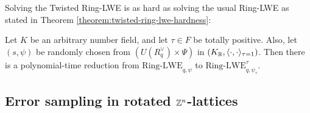 \documentclass[a4paper,12pt]{article}
\begin{document}
Solving the Twisted Ring-LWE is as hard as solving the usual Ring-LWE as stated in Theorem \ref{theorem:twisted-ring-lwe-hardness}:

\begin{theorem}
  \label{theorem:twisted-ring-lwe-hardness}
  Let $K$ be an arbitrary number field, and let $\tau \in F$ be totally positive.
  Also, let $(s,\psi)$ be randomly chosen from $(U(R_q^\vee)\times \Psi)$ in $(K_{\mathbb{R}},\langle{\cdot,\cdot}\rangle_{\tau=1})$.
  Then there is a polynomial-time reduction from $\mbox{Ring-LWE}_{q,\psi}$ to $\mbox{Ring-LWE}^\tau_{q,\psi_\tau}$.
\end{theorem}
\subsection{Error sampling in rotated \(\mathbb{Z}^n\)-lattices}
\label{sampling-in-zn-rotated-lattices}
\end{document}
